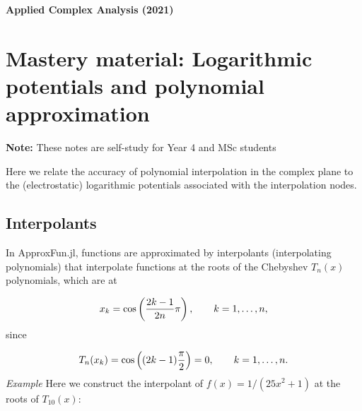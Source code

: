 \documentclass[12pt,a4paper]{article}
\begin{document}
\textbf{Applied Complex Analysis (2021)}

\section{Mastery material: Logarithmic potentials and polynomial approximation}
\textbf{Note:} These notes are self-study for Year 4 and MSc students

Here we relate the accuracy of polynomial interpolation in the complex plane to the (electrostatic) logarithmic potentials associated with the interpolation nodes.

\subsection{Interpolants}
In ApproxFun.jl, functions are approximated by interpolants (interpolating polynomials) that interpolate functions at the roots of the Chebyshev $T_n(x)$ polynomials, which are at

\[
x_k = \cos\left( {2k-1 \over 2n} \pi  \right), \qquad k = 1, \ldots, n,
\]
since

\[
T_n(x_k) = \cos \left( (2k-1){\pi \over 2}  \right) = 0, \qquad k = 1, \ldots, n.
\]
\emph{Example} Here we construct the interpolant of $f(x) = 1/(25x^2 +1)$ at the roots of $T_{10}(x)$:
\end{document}
